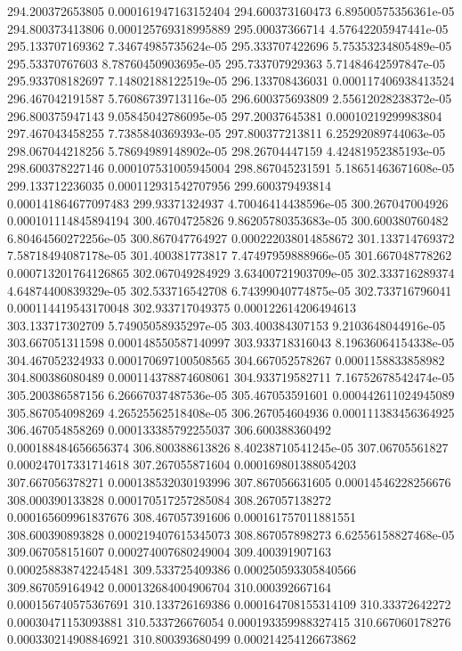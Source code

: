 {294.200372653805 0.000161947163152404
294.600373160473 6.89500575356361e-05
294.800373413806 0.000125769318995889
295.00037366714 4.57642205947441e-05
295.133707169362 7.34674985735624e-05
295.333707422696 5.75353234805489e-05
295.53370767603 8.78760450903695e-05
295.733707929363 5.71484642597847e-05
295.933708182697 7.14802188122519e-05
296.133708436031 0.000117406938413524
296.467042191587 5.76086739713116e-05
296.600375693809 2.55612028238372e-05
296.800375947143 9.05845042786095e-05
297.20037645381 0.00010219299983804
297.467043458255 7.7385840369393e-05
297.800377213811 6.25292089744063e-05
298.067044218256 5.78694989148902e-05
298.26704447159 4.42481952385193e-05
298.600378227146 0.000107531005945004
298.867045231591 5.18651463671608e-05
299.133712236035 0.000112931542707956
299.600379493814 0.000141864677097483
299.93371324937 4.70046414438596e-05
300.267047004926 0.000101114845894194
300.46704725826 9.86205780353683e-05
300.600380760482 6.80464560272256e-05
300.867047764927 0.000222038014858672
301.133714769372 7.58718494087178e-05
301.400381773817 7.47497959888966e-05
301.667048778262 0.000713201764126865
302.067049284929 3.63400721903709e-05
302.333716289374 4.64874400839329e-05
302.533716542708 6.74399040774875e-05
302.733716796041 0.000114419543170048
302.933717049375 0.000122614206494613
303.133717302709 5.74905058935297e-05
303.400384307153 9.2103648044916e-05
303.667051311598 0.000148550587140997
303.933718316043 8.19636064154338e-05
304.467052324933 0.000170697100508565
304.667052578267 0.0001158833858982
304.800386080489 0.000114378874608061
304.933719582711 7.16752678542474e-05
305.200386587156 6.26667037487536e-05
305.467053591601 0.000442611024945089
305.867054098269 4.26525562518408e-05
306.267054604936 0.000111383456364925
306.467054858269 0.000133385792255037
306.600388360492 0.000188484656656374
306.800388613826 8.40238710541245e-05
307.06705561827 0.000247017331714618
307.267055871604 0.000169801388054203
307.667056378271 0.000138532030193996
307.867056631605 0.00014546228256676
308.000390133828 0.000170517257285084
308.267057138272 0.000165609961837676
308.467057391606 0.000161757011881551
308.600390893828 0.000219407615345073
308.867057898273 6.62556158827468e-05
309.067058151607 0.000274007680249004
309.400391907163 0.000258838742245481
309.533725409386 0.000250593305840566
309.867059164942 0.000132684004906704
310.000392667164 0.000156740575367691
310.133726169386 0.000164708155314109
310.33372642272 0.00030471153093881
310.533726676054 0.000193359988327415
310.667060178276 0.000330214908846921
310.800393680499 0.000214254126673862
}
